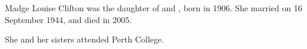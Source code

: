 
Madge Louise Clifton was the daughter of  and , born in 1906.
She married  on 16 September 1944,\cite{GilmoreEngagement1944} and died in 2005.

She and her sisters attended Perth College.\cite{WestAusSocialNotes1913}
